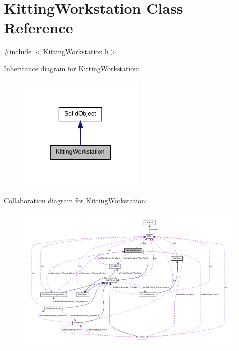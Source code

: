 \hypertarget{class_kitting_workstation}{
\section{KittingWorkstation Class Reference}
\label{class_kitting_workstation}
}


{\ttfamily \#include $<$KittingWorkstation.h$>$}



Inheritance diagram for KittingWorkstation:\nopagebreak
\begin{figure}[H]
\begin{center}
\leavevmode
\includegraphics[width=170pt]{class_kitting_workstation__inherit__graph}
\end{center}
\end{figure}


Collaboration diagram for KittingWorkstation:\nopagebreak
\begin{figure}[H]
\begin{center}
\leavevmode
\includegraphics[width=400pt]{class_kitting_workstation__coll__graph}
\end{center}
\end{figure}
